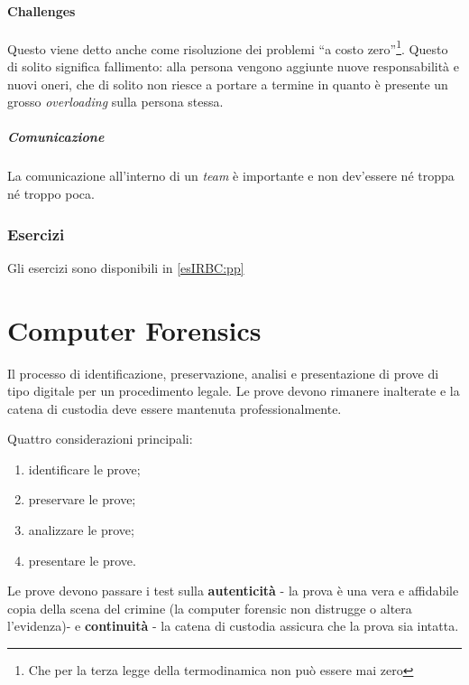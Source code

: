 \subsubsection{Challenges}

Questo viene detto anche come risoluzione dei problemi ``a costo
zero''\footnote{Che per la terza legge della termodinamica non può essere mai
zero}. Questo di solito significa fallimento: alla persona vengono aggiunte
nuove responsabilità e nuovi oneri, che di solito non riesce a portare a termine
in quanto è presente un grosso \textit{overloading} sulla persona stessa.

\paragraph*{Comunicazione} La comunicazione all'interno di un \textit{team} è
importante e non dev'essere né troppa né troppo poca.

\subsection{Esercizi}

Gli esercizi sono disponibili in \ref{esIRBC:pp}

\chapter{Computer Forensics}
\label{IRBC:cf}

Il processo di identificazione, preservazione, analisi e presentazione di prove 
di tipo digitale per un procedimento legale. Le prove devono rimanere inalterate 
e la catena di custodia deve essere mantenuta professionalmente.

Quattro considerazioni principali:

\begin{enumerate}
\item identificare le prove;
\item preservare le prove;
\item analizzare le prove;
\item presentare le prove.
\end{enumerate}

Le prove devono passare i test sulla \textbf{autenticità} - la prova è una vera 
e affidabile copia della scena del crimine (la computer forensic non distrugge 
o altera l'evidenza)- e \textbf{continuità} - la catena di custodia assicura 
che la prova sia intatta.

